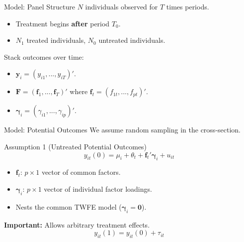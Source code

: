 \documentclass{beamer}
\newcommand{\1}{\mathds{1}} %
\begin{document}

\begin{frame}{Model: Panel Structure}
    $N$ individuals observed for $T$ times periods.
\begin{itemize}
    \item Treatment begins \textbf{after} period $T_0$.
    \item $N_1$ treated individuals, $N_0$ untreated individuals.
\end{itemize}

\vspace{.5cm}

Stack outcomes over time:
\begin{itemize}
    \item $\bm y_i = (y_{i1},...,y_{iT})'$.
    \item $\bm F = (\bm f_1,...,\bm f_T)'$ where $\bm f_t = (f_{1t},...,f_{pt})'$.
    \item $\bm \gamma_i = (\gamma_{i1},...,\gamma_{ip})'$.
\end{itemize}
\end{frame}


\begin{frame}{Model: Potential Outcomes}
We assume random sampling in the cross-section.

    \begin{block}{Assumption 1 (Untreated Potential Outcomes)}
        \begin{equation}
            y_{it}(0) = \mu_i + \theta_t + \bm f_t' \bm \gamma_i + u_{it}
        \end{equation}
    \end{block}
        \begin{itemize}
            \item $\bm f_t$: $p \times 1$ vector of common factors.
            \item $\bm \gamma_i$: $p \times 1$ vector of individual factor loadings.
            \item Nests the common TWFE model ($\bm \gamma_i = \bm 0$). 
        \end{itemize}

        \vspace{.5 cm}

        \textbf{Important:} Allows arbitrary treatment effects.
        \begin{equation}
            y_{it}(1) = y_{it}(0) + \tau_{it}
        \end{equation}
\end{frame}
\end{document}

